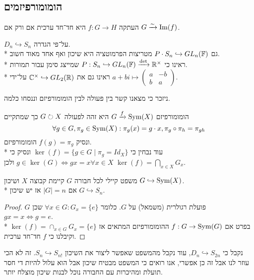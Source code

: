 \subsection{הומומורפיזמים}
\begin{proposition}
	העתקה $f : G \to H$ היא חד־חד ערכית אם ורק אם $G \xrightarrow{\sim} \operatorname{Im}(f)$.
\end{proposition}
\begin{example}
	$D_n \hookrightarrow S_n$ על־פי הגדרה. \\*
	גם $P \cdot S_n \hookrightarrow GL_n(\mathbb{F})$ מטריצות הפרמוטציה היא שיכון ואף אחד מאוד חשוב. \\*
	ראינו כי $P : S_n \hookrightarrow GL_n(\mathbb{F}) \xrightarrow{\det} \mathbb{R}^\times$ שמייצג סימן עבור תמורות. \\*
	ראינו גם את $\mathbb{C}^\times \hookrightarrow GL_2(\mathbb{R})$ על־ידי $a + bi \mapsto \begin{pmatrix} a & -b \\ b & a \end{pmatrix}$.
\end{example}
ניזכר כי מצאנו קשר בין פעולה לבין הומומורפיזם וננסחו כלמה.
\begin{lemma}
	הומומורפיזם $G \xrightarrow{f} \operatorname{Sym}(X)$ היא זהה לפעולה $G \circlearrowright X$  כך שמתקיים
	\[
		\forall g \in G, \pi_g \in \operatorname{Sym}(X) : \pi_g(x) = g \cdot x, \pi_g \circ \pi_h = \pi_{gh}
	\]
	ונסיק $f(g) = \pi_g$ הומומורפיזם. \\*
	עוד נבחין כי $\ker(f) = \{ g \in G \mid \pi_g = Id_X \}$
	ונסיק כי $g \in \ker(G) \iff gx = x \forall x \in X$
	ולכן $\ker(f) = \bigcap_{x \in X} G_x$.
\end{lemma}
\begin{theorem}{משפט קיילי}
	לכל חבורה $G$ קיימת קבוצה $X$ ושיכון $G \hookrightarrow \operatorname{Sym}(X)$. \\*
	אם $|G| = n$ אז יש שיכון $G \hookrightarrow S_n$.
\end{theorem}
\begin{proof}
	$G$ פועלת רגולרית (משמאל) על $G$.
	כלומר $\forall x \in G : G_x = \{e\}$ שכן $gx = x \iff g = e$. \\*
	בפרט אם $f : G \to \operatorname{Sym}(G)$ ההומומורפיזם המתאים אז $\ker(f) = \cap_{x \in G} G_x = \{ e \}$
	וקיבלנו כי $f$ חד־חד ערכית.
\end{proof}
\begin{example}
	נקבל כי $D_n \hookrightarrow S_{2n}$, עוד נקבל מהמשפט שאפשר ליצור את השיכון $S_n \hookrightarrow S_{n!}$.
	זה לא הכי עוזר לנו אבל זה כן אפשרי, אנו רואים כי המשפט מבטיח שיכון אבל הוא עלול להיות די חסר תועלת ומהיכרות עם החבורה נוכל לבנות שיכון מוצלח יותר.
\end{example}
